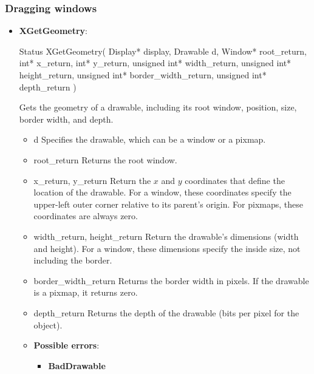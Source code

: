 \documentclass{report}
\begin{document}
    \subsubsection{Dragging windows}
    \begin{itemize}
        \item \textbf{XGetGeometry}:
            \bigbreak \noindent 
            \begin{cppcode}
                Status XGetGeometry(
                    Display* display, 
                    Drawable d,
                    Window* root_return,
                    int* x_return, int* y_return,
                    unsigned int* width_return, unsigned int* height_return,
                    unsigned int* border_width_return,
                    unsigned int* depth_return
                )
            \end{cppcode}
            \bigbreak \noindent
            Gets the geometry of a drawable, including its root window, position, size, border width, and depth.
            \begin{itemize}
                \item d Specifies the drawable, which can be a window or a pixmap.
                \item root\_return Returns the root window.
                \item x\_return, y\_return Return the $x$ and $y$ coordinates that define the location of the drawable. For a window, these coordinates specify the upper-left outer corner relative to its parent’s origin. For pixmaps, these coordinates are always zero.
                \item width\_return, height\_return Return the drawable’s dimensions (width and height). For a window, these dimensions specify the inside size, not including the border.
                \item border\_width\_return Returns the border width in pixels. If the drawable is a pixmap, it returns zero.
                \item depth\_return Returns the depth of the drawable (bits per pixel for the object).
            \end{itemize}
            \begin{itemize}
                \item \textbf{Possible errors}:
                    \begin{itemize}
                        \item \textbf{BadDrawable}
                    \end{itemize}

\end{itemize}
\end{itemize}
\end{document}
